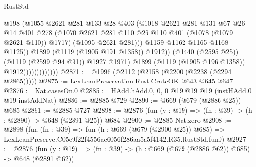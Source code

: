 \begin{lexlean}{RustStd}
\begin{coremodule}
                                        @198
                                        (@1055
                                          @2621
                                          @281
                                          @133
                                          @28
                                          @403
                                          (@1018
                                            @2621
                                            @281
                                            @131
                                            @67
                                            @26
                                            @14
                                            @401
                                            @278
                                            (@1070
                                              @2621
                                              @281
                                              @110
                                              @26
                                              @110
                                              @401
                                              (@1078 (@1079 @2621 @110))
                                              @1717)
                                            (@1095 @2621 @281)))
                                        @1159
                                        @1162
                                        @1165
                                        @1168
                                        @1125))
                                    @1899
                                    (@1119 (@1905 @191 @1358))
                                    @1912))
                                (@1440 (@2595 @25))
                                (@1119 (@2599 @94 @91))
                                @1927
                                @1971)
                              @1899
                              (@1119 (@1905 @196 @1358))
                              @1912)))))))))))))
@2871 := @1996 (@2112 (@2158 (@2200 (@2238 (@2294 @2865)))))
@2875 := LexLeanPreservation.Rust.CrateOK @643 @645 @647
@2876 := Nat.casesOn.{0}
@2885 := HAdd.hAdd.{0, 0, 0} @19 @19 @19 (instHAdd.{0} @19 instAddNat)
@2886 := @2885 @729
@2890 := @669 (@679 (@2886 @25)) @685
@2891 := @2885 @727
@2898 := @2876 (fun (y : @19) => (fn : @39) -> (h : @2890) -> @648 (@2891 @25)) @684
@2900 := @2885 Nat.zero
@2908 := @2898
    (fun (fn : @39) =>
    fun (h : @669 (@679 (@2900 @25)) @685) =>
    LexLeanPreserve.C05e9f22f4556ac6056f286aa5a5f4142.R35.RustStd.fun0)
@2927 := @2876
    (fun (y : @19) => (fn : @39) -> (h : @669 (@679 (@2886 @62)) @685) -> @648 (@2891 @62))

\end{coremodule}
\end{lexlean}
